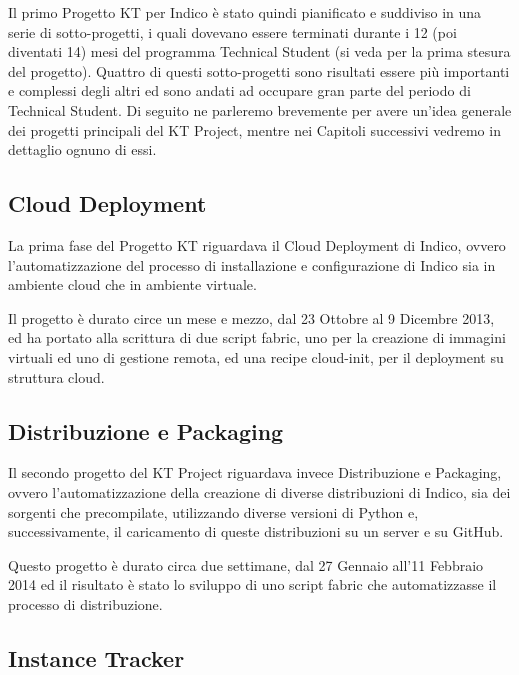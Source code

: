     	Il primo Progetto KT per Indico è stato quindi pianificato e suddiviso in una serie di sotto-progetti, i quali dovevano essere terminati durante i 12 (poi diventati 14) mesi del programma Technical Student (si veda \cite{pedro:gist} per la prima stesura del progetto). Quattro di questi sotto-progetti sono risultati essere più importanti e complessi degli altri ed sono andati ad occupare gran parte del periodo di Technical Student. Di seguito ne parleremo brevemente per avere un'idea generale dei progetti principali del KT Project, mentre nei Capitoli successivi vedremo in dettaglio ognuno di essi.
    	
    	\subsection{Cloud Deployment} \label{subsec:p;pp;cloud}
    	
        	La prima fase del Progetto KT riguardava il Cloud Deployment di Indico, ovvero l'automatizzazione del processo di installazione e configurazione di Indico sia in ambiente cloud che in ambiente virtuale.
        	
        	Il progetto è durato circe un mese e mezzo, dal 23 Ottobre al 9 Dicembre 2013, ed ha portato alla scrittura di due script fabric, uno per la creazione di immagini virtuali ed uno di gestione remota, ed una recipe cloud-init, per il deployment su struttura cloud.
    	
    	\subsection{Distribuzione e Packaging} \label{subsec:p;pp:distribuzione}
    	
        	Il secondo progetto del KT Project riguardava invece Distribuzione e Packaging, ovvero l'automatizzazione della creazione di diverse distribuzioni di Indico, sia dei sorgenti che precompilate, utilizzando diverse versioni di Python e, successivamente, il caricamento di queste distribuzioni su un server e su GitHub.
        	
        	Questo progetto è durato circa due settimane, dal 27 Gennaio all'11 Febbraio 2014 ed il risultato è stato lo sviluppo di uno script fabric che automatizzasse il processo di distribuzione.
    	
    	\subsection{Instance Tracker} \label{subsec:p;pp;instance_tracker}
    	
